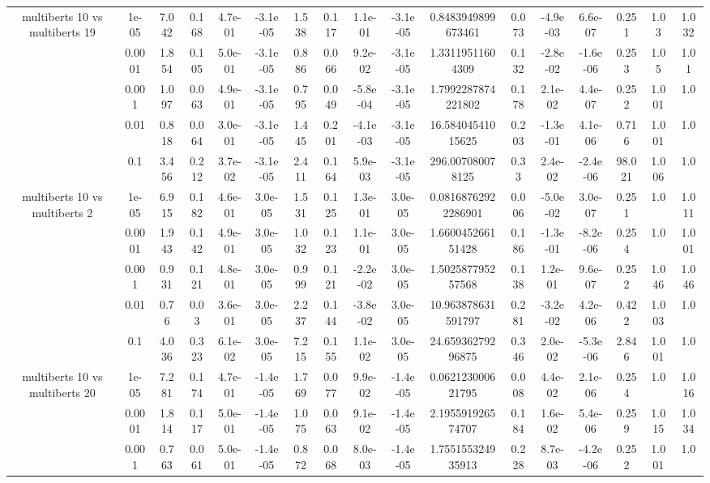 \begin{tabular}{|c|c|c|c|c|c|c|c|c|c|c|c|c|c|c|c|c|}
\hline
\multirow{5}{*}{multiberts 10 vs multiberts 19} & 1e-05 & 7.042 & 0.168 & 4.7e-01 & -3.1e-05 & 1.538 & 0.117 & 1.1e-01 & -3.1e-05 & 0.8483949899673461 & 0.073 & -4.9e-03 & 6.6e-07 & 0.251 & 1.03 & 1.032 \\
 & 0.0001 & 1.854 & 0.105 & 5.0e-01 & -3.1e-05 & 0.886 & 0.066 & 9.2e-02 & -3.1e-05 & 1.33119511604309 & 0.132 & -2.8e-02 & -1.6e-06 & 0.253 & 1.05 & 1.01 \\
 & 0.001 & 1.097 & 0.063 & 4.9e-01 & -3.1e-05 & 0.795 & 0.049 & -5.8e-04 & -3.1e-05 & 1.7992287874221802 & 0.178 & 2.1e-02 & 4.4e-07 & 0.252 & 1.001 & 1.0 \\
 & 0.01 & 0.818 & 0.064 & 3.0e-01 & -3.1e-05 & 1.445 & 0.201 & -4.1e-03 & -3.1e-05 & 16.58404541015625 & 0.203 & -1.3e-01 & 4.1e-06 & 0.716 & 1.001 & 1.0 \\
 & 0.1 & 3.456 & 0.212 & 3.7e-02 & -3.1e-05 & 2.411 & 0.164 & 5.9e-03 & -3.1e-05 & 296.007080078125 & 0.33 & 2.4e-02 & -2.4e-06 & 98.021 & 1.006 & 1.0 \\
\hline
\multirow{5}{*}{multiberts 10 vs multiberts 2} & 1e-05 & 6.915 & 0.182 & 4.6e-01 & 3.0e-05 & 1.531 & 0.125 & 1.3e-01 & 3.0e-05 & 0.08168762922286901 & 0.006 & -5.0e-02 & 3.0e-07 & 0.251 & 1.0 & 1.011 \\
 & 0.0001 & 1.943 & 0.142 & 4.9e-01 & 3.0e-05 & 1.032 & 0.123 & 1.1e-01 & 3.0e-05 & 1.660045266151428 & 0.186 & -1.3e-01 & -8.2e-06 & 0.254 & 1.0 & 1.001 \\
 & 0.001 & 0.931 & 0.121 & 4.8e-01 & 3.0e-05 & 0.999 & 0.121 & -2.2e-02 & 3.0e-05 & 1.502587795257568 & 0.138 & 1.2e-01 & 9.6e-07 & 0.252 & 1.046 & 1.046 \\
 & 0.01 & 0.76 & 0.03 & 3.6e-01 & 3.0e-05 & 2.237 & 0.144 & -3.8e-02 & 3.0e-05 & 10.963878631591797 & 0.281 & -3.2e-02 & 4.2e-06 & 0.422 & 1.003 & 1.0 \\
 & 0.1 & 4.036 & 0.323 & 6.1e-02 & 3.0e-05 & 7.215 & 0.155 & 1.1e-02 & 3.0e-05 & 24.65936279296875 & 0.346 & 2.0e-02 & -5.3e-06 & 2.846 & 1.001 & 1.0 \\
\hline
\multirow{5}{*}{multiberts 10 vs multiberts 20} & 1e-05 & 7.281 & 0.174 & 4.7e-01 & -1.4e-05 & 1.769 & 0.077 & 9.9e-02 & -1.4e-05 & 0.062123000621795 & 0.008 & 4.4e-02 & 2.1e-06 & 0.254 & 1.0 & 1.016 \\
 & 0.0001 & 1.814 & 0.117 & 5.0e-01 & -1.4e-05 & 1.075 & 0.063 & 9.1e-02 & -1.4e-05 & 2.195591926574707 & 0.184 & 1.6e-02 & 5.4e-06 & 0.259 & 1.015 & 1.034 \\
 & 0.001 & 0.763 & 0.061 & 5.0e-01 & -1.4e-05 & 0.872 & 0.068 & 8.0e-03 & -1.4e-05 & 1.755155324935913 & 0.228 & 8.7e-03 & -4.2e-06 & 0.252 & 1.001 & 1.0 \\

\end{tabular}
